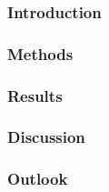\subsubsection{Introduction}
\subsubsection{Methods}
\subsubsection{Results}
\subsubsection{Discussion}
\subsubsection{Outlook}
\FloatBarrier
